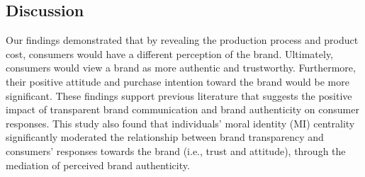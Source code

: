 \documentclass[a0,portrait]{a0poster}
\begin{document}
\begin{minipage}[c]{\linewidth}
\begin{framed}
\begin{multicols}{2}
\section*{Discussion}
\color{Black}
Our findings demonstrated that by revealing the production process and product cost, consumers would have a different perception of the brand. Ultimately, consumers would view a brand as more authentic and trustworthy. Furthermore, their positive attitude and purchase intention toward the brand would be more significant. These findings support previous literature that suggests the positive impact of transparent brand communication and brand authenticity on consumer responses. This study also found that individuals’ moral identity (MI) centrality significantly
moderated the relationship between brand transparency and consumers’ responses towards the brand (i.e., trust and attitude), through the mediation of perceived brand authenticity.


\color{Maroon} \\
\color{Black}
\printbibliography
\end{multicols}
\vspace{0.5cm}
\end{framed}
\end{minipage}
\end{document}

